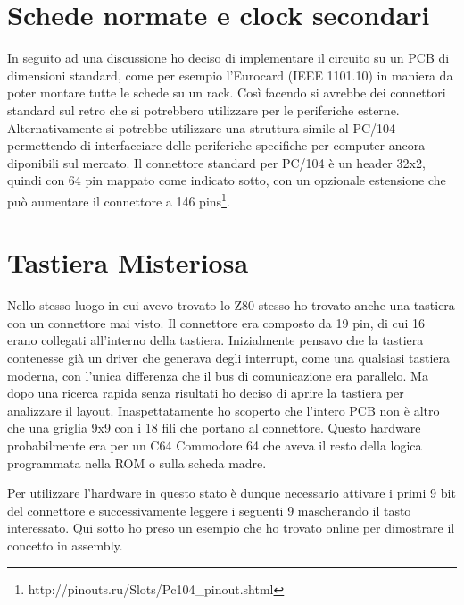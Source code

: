 \documentclass[final, ms, a4paper, 11pt]{memoir}
\newcommand\ddate{01.01.1970}
\begin{document}
\renewcommand\ddate{06.03.2017}
\section{Schede normate e clock secondari}
In seguito ad una discussione ho deciso di implementare il circuito su un PCB di
dimensioni standard, come per esempio l'Eurocard (IEEE 1101.10) in maniera da
poter montare tutte le schede su un rack. Cos\`i facendo si avrebbe dei
connettori standard sul retro che si potrebbero utilizzare per le periferiche
esterne. Alternativamente si potrebbe utilizzare una struttura simile al PC/104
permettendo di interfacciare delle periferiche specifiche per computer ancora
diponibili sul mercato. Il connettore standard per PC/104 \`e un header 32x2,
quindi con 64 pin mappato come indicato sotto, con un opzionale estensione che
pu\`o aumentare il connettore a 146
pins\footnote{http://pinouts.ru/Slots/Pc104_pinout.shtml}.
\begin{tabular}
\end{tabular}

\renewcommand\ddate{07.03.2017}
\section{Tastiera Misteriosa}
Nello stesso luogo in cui avevo trovato lo Z80 stesso ho trovato anche una
tastiera con un connettore mai visto. Il connettore era composto da 19 pin, di
cui 16 erano collegati all'interno della tastiera. Inizialmente pensavo che la
tastiera contenesse gi\`a un driver che generava degli interrupt, come una
qualsiasi tastiera moderna, con l'unica differenza che il bus di comunicazione
era parallelo. Ma dopo una ricerca rapida senza risultati ho deciso di aprire la
tastiera per analizzare il layout. Inaspettatamente ho scoperto che l'intero PCB
non \`e altro che una griglia 9x9 con i 18 fili che portano al connettore.
Questo hardware probabilmente era per un C64 Commodore 64 che aveva il resto
della logica programmata nella ROM o sulla scheda madre.

Per utilizzare l'hardware in questo stato \`e dunque necessario attivare i
primi 9 bit del connettore e successivamente leggere i seguenti 9 mascherando il
tasto interessato. Qui sotto ho preso un esempio che ho trovato online per
dimostrare il concetto in assembly.
\end{document}
